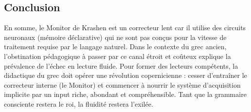 \subsection{Conclusion}

En somme, le Monitor de Krashen est un \og correcteur lent\fg{} car il utilise des circuits
neuronaux (mémoire déclarative) qui ne sont pas conçus pour la vitesse de traitement requise par le
langage naturel. Dans le contexte du grec ancien, l'obstination pédagogique à passer par ce canal
étroit et coûteux explique la prévalence de l'échec en lecture fluide. Pour former des lecteurs
compétents, la didactique du grec doit opérer une révolution copernicienne : cesser d'entraîner le
correcteur interne (le Monitor) et commencer à nourrir le système d'acquisition implicite par un
input riche, abondant et compréhensible. Tant que la grammaire consciente restera le roi, la
fluidité restera l'exilée.

